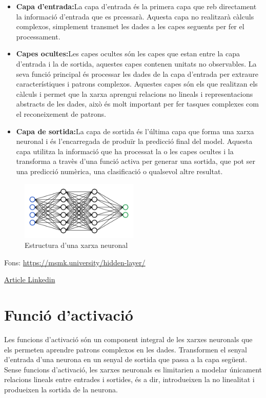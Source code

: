 \begin{itemize}
 \item \textbf{Capa d'entrada:}La capa d'entrada és la primera capa que reb directament la informació d'entrada que es prcessarà. Aquesta capa no realitzarà càlculs complexos, simplement transmet les dades a les capes seguents per fer el processament.
 \item \textbf{Capes ocultes:}Les capes ocultes són les capes que estan entre la capa d'entrada i la de sortida, aquestes capes contenen unitats no observables. La seva funció principal és processar les dades de la capa d'entrada per extraure característiques i patrons complexos. Aquestes capes són els que realitzan els càlculs i permet que la xarxa aprengui relacions no lineals i representacions abstracts de les dades, això és molt important per fer tasques complexes com el reconeixement de patrons.
 \item \textbf{Capa de sortida:}La capa de sortida és l'última capa que forma una xarxa neuronal i és l'encarregada de produïr la predicció final del model. Aquesta capa utilitza la informació que ha processat la o les capes ocultes i la transforma a travès d'una funció activa per generar una sortida, que pot ser una predicció numèrica, una clasificació o qualsevol altre resultat.
 \end{itemize}


\begin{figure}[h!]
    \centering
    \includegraphics[width=0.5\textwidth]{./figures/xarxa.png}
    \caption{Estructura d'una xarxa neuronal}
\end{figure}

Fons: \href{https://msmk.university/hidden-layer/}{https://msmk.university/hidden-layer/}

\href{https://www.linkedin.com/advice/0/what-some-examples-linear-nonlinear-models-real-world?lang=es&lang=es&originalSubdomain=es}{Article Linkedin}

\section{Funció d'activació}\label{sec:3.5.3}
Les funcions d'activació són un component integral de les xarxes neuronals que els permeten aprendre patrons complexos en les dades. Transformen el senyal d'entrada d'una neurona en un senyal de sortida que passa a la capa següent. Sense funcions d'activació, les xarxes neuronals es limitarien a modelar únicament relacions lineals entre entrades i sortides, és a dir, introdueixen la no linealitat i produeixen la sortida de la neurona.

